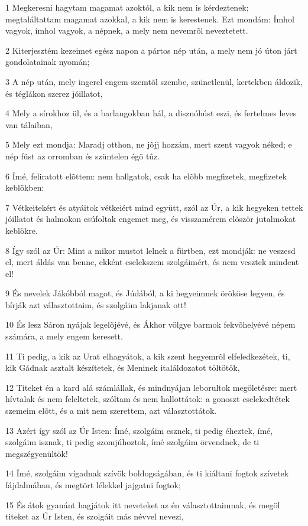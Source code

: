 \par 1 Megkeresni hagytam magamat azoktól, a kik nem is kérdeztenek; megtaláltattam magamat azokkal, a kik nem is kerestenek. Ezt mondám: Ímhol vagyok, ímhol vagyok, a népnek, a mely nem nevemrõl neveztetett.
\par 2 Kiterjesztém kezeimet egész napon a pártos nép után, a mely nem jó úton járt gondolatainak nyomán;
\par 3 A nép után, mely ingerel engem szemtõl szembe, szünetlenül, kertekben áldozik, és téglákon szerez jóillatot,
\par 4 Mely a sírokhoz ül, és a barlangokban hál, a disznóhúst eszi, és fertelmes leves van tálaiban,
\par 5 Mely ezt mondja: Maradj otthon, ne jõjj hozzám, mert szent vagyok néked; e nép füst az orromban és szüntelen égõ tûz.
\par 6 Ímé, feliratott elõttem: nem hallgatok, csak ha elõbb megfizetek, megfizetek keblökben:
\par 7 Vétkeitekért és atyáitok vétkeiért mind együtt, szól az Úr, a kik hegyeken tettek jóillatot és halmokon csúfoltak engemet meg, és visszamérem elõször jutalmokat keblökre.
\par 8 Így szól az Úr: Mint a mikor mustot lelnek a fürtben, ezt mondják: ne veszesd el, mert áldás van benne, ekként cselekszem szolgáimért, és nem vesztek mindent el!
\par 9 És nevelek Jákóbból magot, és Júdából, a ki hegyeimnek örököse legyen, és bírják azt választottaim, és szolgáim lakjanak ott!
\par 10 És lesz Sáron nyájak legelõjévé, és Ákhor völgye barmok fekvõhelyévé népem számára, a mely engem keresett.
\par 11 Ti pedig, a kik az Urat elhagyátok, a kik szent hegyemrõl elfeledkezétek, ti, kik Gádnak asztalt készítetek, és Meninek italáldozatot töltötök,
\par 12 Titeket én a kard alá számlállak, és mindnyájan leborultok megöletésre: mert hívtalak és nem feleltetek, szóltam és nem hallottátok: a gonoszt cselekedtétek szemeim elõtt, és a mit nem szerettem, azt választottátok.
\par 13 Azért így szól az Úr Isten: Ímé, szolgáim esznek, ti pedig éheztek, ímé, szolgáim isznak, ti pedig szomjúhoztok, ímé szolgáim örvendnek, de ti megszégyenültök!
\par 14 Ímé, szolgáim vígadnak szívök boldogságában, és ti kiáltani fogtok szívetek fájdalmában, és megtört lélekkel jajgatni fogtok;
\par 15 És átok gyanánt hagjátok itt neveteket az én választottaimnak, és megöl titeket az Úr Isten, és szolgáit más névvel nevezi,
